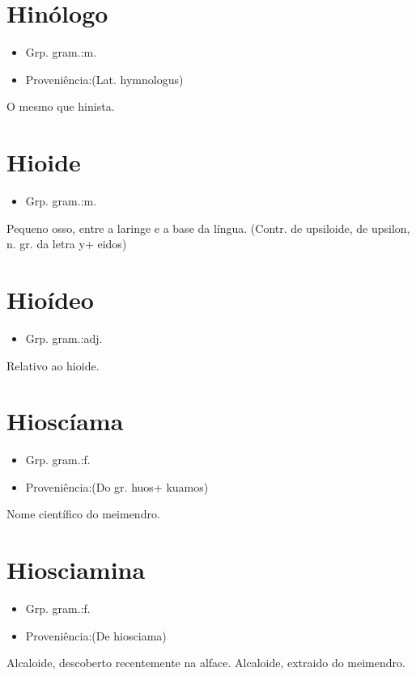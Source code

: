\documentclass{article}
\begin{document}
\section{Hinólogo}
\begin{itemize}
\item {Grp. gram.:m.}
\end{itemize}
\begin{itemize}
\item {Proveniência:(Lat. \textunderscore hymnologus\textunderscore )}
\end{itemize}
O mesmo que \textunderscore hinista\textunderscore .
\section{Hioide}
\begin{itemize}
\item {Grp. gram.:m.}
\end{itemize}
Pequeno osso, entre a laringe e a base da língua.
(Contr. de \textunderscore upsiloide\textunderscore , de \textunderscore upsilon\textunderscore , n. gr. da letra \textunderscore y\textunderscore  + \textunderscore eidos\textunderscore )
\section{Hioídeo}
\begin{itemize}
\item {Grp. gram.:adj.}
\end{itemize}
Relativo ao hioide.
\section{Hioscíama}
\begin{itemize}
\item {Grp. gram.:f.}
\end{itemize}
\begin{itemize}
\item {Proveniência:(Do gr. \textunderscore huos\textunderscore  + \textunderscore kuamos\textunderscore )}
\end{itemize}
Nome científico do meimendro.
\section{Hiosciamina}
\begin{itemize}
\item {Grp. gram.:f.}
\end{itemize}
\begin{itemize}
\item {Proveniência:(De \textunderscore hiosciama\textunderscore )}
\end{itemize}
Alcaloide, descoberto recentemente na alface.
Alcaloide, extraido do meimendro.
\end{document}
